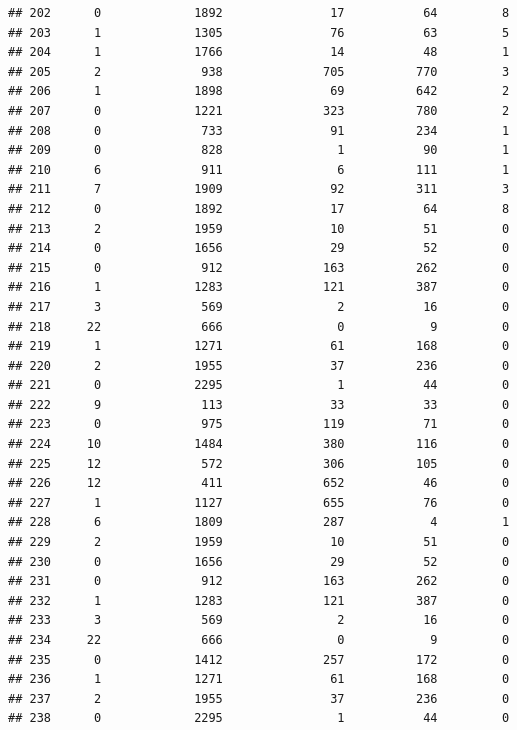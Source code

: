 \documentclass[
]{article}
\begin{document}
\begin{verbatim}
## 202      0             1892               17           64         8
## 203      1             1305               76           63         5
## 204      1             1766               14           48         1
## 205      2              938              705          770         3
## 206      1             1898               69          642         2
## 207      0             1221              323          780         2
## 208      0              733               91          234         1
## 209      0              828                1           90         1
## 210      6              911                6          111         1
## 211      7             1909               92          311         3
## 212      0             1892               17           64         8
## 213      2             1959               10           51         0
## 214      0             1656               29           52         0
## 215      0              912              163          262         0
## 216      1             1283              121          387         0
## 217      3              569                2           16         0
## 218     22              666                0            9         0
## 219      1             1271               61          168         0
## 220      2             1955               37          236         0
## 221      0             2295                1           44         0
## 222      9              113               33           33         0
## 223      0              975              119           71         0
## 224     10             1484              380          116         0
## 225     12              572              306          105         0
## 226     12              411              652           46         0
## 227      1             1127              655           76         0
## 228      6             1809              287            4         1
## 229      2             1959               10           51         0
## 230      0             1656               29           52         0
## 231      0              912              163          262         0
## 232      1             1283              121          387         0
## 233      3              569                2           16         0
## 234     22              666                0            9         0
## 235      0             1412              257          172         0
## 236      1             1271               61          168         0
## 237      2             1955               37          236         0
## 238      0             2295                1           44         0

\end{verbatim}
\end{document}
